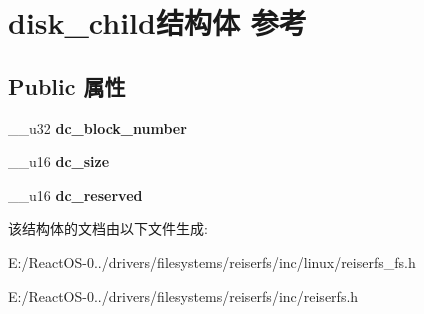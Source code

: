 \hypertarget{structdisk__child}{}\section{disk\+\_\+child结构体 参考}
\label{structdisk__child}
\subsection*{Public 属性}
\begin{DoxyCompactItemize}
\item 
\mbox{\label{structdisk__child_ae68bbbb79da14aebed7173295a5aa89d}} 
\+\_\+\+\_\+u32 {\bfseries dc\+\_\+block\+\_\+number}
\item 
\mbox{\label{structdisk__child_a737467c5836dfa1960263d53bc5f1d50}} 
\+\_\+\+\_\+u16 {\bfseries dc\+\_\+size}
\item 
\mbox{\label{structdisk__child_ad3989600fc83c516323ceeba4744503d}} 
\+\_\+\+\_\+u16 {\bfseries dc\+\_\+reserved}
\end{DoxyCompactItemize}


该结构体的文档由以下文件生成\+:\begin{DoxyCompactItemize}
\item 
E\+:/\+React\+O\+S-\/0../drivers/filesystems/reiserfs/inc/linux/reiserfs\+\_\+fs.\+h\item 
E\+:/\+React\+O\+S-\/0../drivers/filesystems/reiserfs/inc/reiserfs.\+h\end{DoxyCompactItemize}
